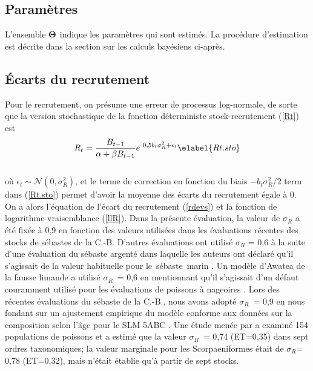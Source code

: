 \documentclass[11pt]{book}
\newcommand{\Norm}{\mathcal{N}}%
\def\bfTh{{\bf \Theta}}%
\newcommand{\angL}{\guillemotleft\,}
\newcommand{\angR}{\,\guillemotright}
\def\minus{%
  \setbox0=\hbox{-}%
  \vcenter{%
    \hrule width\wd0 height 0.05pt%
  }%
}
\def\bfTh{{\bf \Theta}}          %
\def\vsd{\vspace*{1ex}}     %
\newcommand{\eref}[1]{(\ref{#1})}
\renewcommand{\eb}{\vsd \vsd \begin{eqnarray}}
\renewcommand{\ee}{\end{eqnarray} \vsd }
\begin{document}
\subsection{Param\`{e}tres}

L'ensemble $\bfTh$ indique les param\`{e}tres qui sont estim\'{e}s.
La proc\'{e}dure d'estimation est d\'{e}crite dans la section sur les calculs bay\'{e}siens ci-apr\`{e}s.

\subsection{\'{E}carts du recrutement}

Pour le recrutement, on pr\'{e}sume une erreur de processus log-normale, de sorte que la version stochastique de la fonction d\'{e}terministe stock-recrutement (\ref{Rt}) est
\eb
R_t = \frac{B_{t-1}}{\alpha + \beta B_{t-1}} e^{\minus 0,5 b_t \sigma_R^2 + \epsilon_t} \elabel{Rt.sto}
\ee \\[-0.25ex]


o\`{u} $\epsilon_t \sim \Norm(0, \sigma_R^2)$, et le terme de correction en fonction du biais $-b_t \sigma_R^2/2$ term dans \eref{Rt.sto} permet d'avoir la moyenne des \'{e}carts du recrutement \'{e}gale \`{a} 0.
On a alors l'\'{e}quation de l'\'{e}cart du recrutement (\ref{rdevs}) et la fonction de logarithme-vraisemblance (\ref{llR}).
Dans la pr\'{e}sente \'{e}valuation, la valeur de $\sigma_R$ a \'{e}t\'{e} fix\'{e}e \`{a} 0,9 en fonction des valeurs utilis\'{e}es dans les \'{e}valuations r\'{e}centes des stocks de s\'{e}bastes de la C.-B.
D'autres \'{e}valuations ont utilis\'{e} $\sigma_R$ = 0,6 \`{a} la suite d'une \'{e}valuation du s\'{e}baste argent\'{e} \citep{Starr-etal:2016_sgr} dans laquelle les auteurs ont d\'{e}clar\'{e} qu'il s'agissait de la valeur habituelle pour le \angL s\'{e}baste\angR{} marin \citep{Mertz-Myers:1996}.
Un mod\`{e}le d'Awatea de la fausse limande a utilis\'{e} $\sigma_R$~= 0,6 \citep{Holt-etal:2016_rol} en mentionnant qu'il s'agissait d'un d\'{e}faut couramment utilis\'{e} pour les \'{e}valuations de poissons \`{a} nageoires \citep{Beddington-Cooke:1983}.
Lors des r\'{e}centes \'{e}valuations du s\'{e}baste de la C.-B., nous avons adopt\'{e} $\sigma_R$~= 0,9 en nous fondant sur un ajustement empirique du mod\`{e}le conforme aux donn\'{e}es sur la composition selon l'\^{a}ge pour le SLM 5ABC \citep{Edwards-etal:2012_pop5ABC}.
Une \'{e}tude men\'{e}e par \citet{Thorson-etal:2014} a examin\'{e} 154 populations de poissons et a estim\'{e} que la valeur $\sigma_R$~= 0,74 (ET=0,35) dans sept ordres taxonomiques; la valeur marginale pour les Scorpaeniformes \'{e}tait de $\sigma_R$= 0,78 (ET=0,32), mais n'\'{e}tait \'{e}tablie qu'\`{a} partir de sept stocks.
\end{document}
